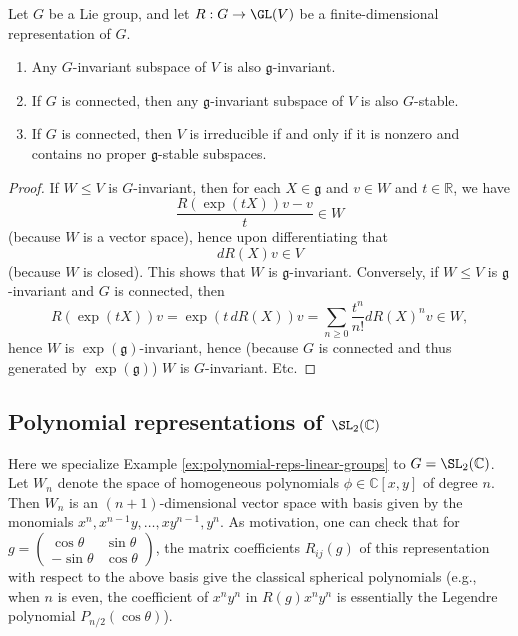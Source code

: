 \documentclass[reqno]{amsart} 
\begin{document}
\begin{theorem}\label{thm:equivalences-irreducibility}
  Let $G$ be a Lie group,
  and let $R: G \rightarrow \GL(V)$ be a finite-dimensional
  representation of $G$.
  \begin{enumerate}
  \item Any $G$-invariant subspace of $V$ is also $\mathfrak{g}$-invariant.
  \item If $G$ is connected,
    then any $\mathfrak{g}$-invariant subspace of $V$ is also
    $G$-stable.
  \item If $G$ is connected, then $V$ is irreducible if and only
    if it is nonzero and contains no proper
    $\mathfrak{g}$-stable subspaces.
  \end{enumerate}
\end{theorem}
\begin{proof}
  If $W \leq V$ is $G$-invariant,
  then for each $X \in \mathfrak{g}$
  and $v \in W$
  and $t \in \mathbb{R}$,
  we have
  \begin{equation*}
    \frac{R(\exp(t X)) v - v}{t} \in W
  \end{equation*}
  (because $W$ is a vector space),
  hence upon differentiating that
  \begin{equation*}
    d R(X) v \in V
  \end{equation*}
  (because $W$ is closed).
  This shows that $W$ is $\mathfrak{g}$-invariant.
  Conversely,
  if $W \leq V$ is $\mathfrak{g}$-invariant and $G$ is
  connected,
  then
  \begin{equation*}
    R(\exp(t X)) v
    = \exp(t \, d R(X)) v
    = \sum_{n \geq 0}
    \frac{t^n}{n!}
    d R(X)^n v
    \in W,
  \end{equation*}
  hence $W$ is $\exp(\mathfrak{g})$-invariant,
  hence (because $G$ is connected
  and thus generated by $\exp(\mathfrak{g})$)
  $W$ is $G$-invariant.
  Etc.
\end{proof}

\subsection{Polynomial representations of \texorpdfstring{$\SL_2(\mathbb{C})$}{SL2(C)}}
\label{sec:orgb2dd983}
\label{sec:reps-sl2-C}
Here we specialize Example
\ref{ex:polynomial-reps-linear-groups} to
$G = \SL_2(\mathbb{C})$.
Let $W_n$ denote the space of homogeneous polynomials
$\phi \in \mathbb{C}[x,y]$
of degree $n$.
Then $W_n$ is an $(n+1)$-dimensional vector space
with basis given by the monomials
$x^n, x^{n-1} y, \dotsc, x y^{n-1}, y^n$.
As motivation, one can check that
for $g = 
\begin{pmatrix}
  \cos \theta  &  \sin \theta  \\
  - \sin \theta  &  \cos \theta 
\end{pmatrix}
$,
the matrix coefficients $R_{ij}(g)$
of this representation
with respect to the above basis
give the classical spherical polynomials (e.g.,
when $n$ is even, the coefficient of $x^n y^n$
in $R(g) x^n y^n$ is essentially the Legendre polynomial
$P_{n/2}(\cos \theta)$).
\end{document}
